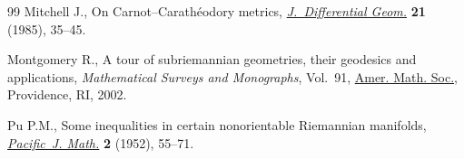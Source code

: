 \documentclass[pdftex]{sigma}
\numberwithin{equation}{section}
\begin{document}
\begin{thebibliography}{99}
Mitchell J., On {C}arnot--{C}arath\'eodory metrics, \href{https://doi.org/10.4310/jdg/1214439462}{\textit{J.~Differential
 Geom.}} \textbf{21} (1985), 35--45.

Montgomery R., A tour of subriemannian geometries, their geodesics and
 applications, \textit{Mathematical Surveys and Monographs}, Vol.~91, \href{https://doi.org/10.1090/surv/091}{Amer.
 Math. Soc.}, Providence, RI, 2002.

Pu P.M., Some inequalities in certain nonorientable {R}iemannian manifolds,
 \href{https://doi.org/10.2140/pjm.1952.2.55}{\textit{Pacific~J. Math.}} \textbf{2} (1952), 55--71.

\end{thebibliography}\LastPageEnding
\end{document}
